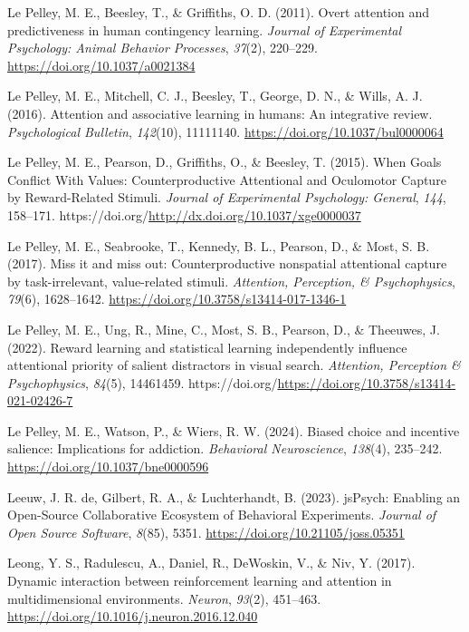 \documentclass[
  man,
  floatsintext,
  longtable,
  nolmodern,
  notxfonts,
  notimes,
  mask,
  colorlinks=true,linkcolor=blue,citecolor=blue,urlcolor=blue]{apa7}
\newlength{\cslhangindent}
\newenvironment{CSLReferences}[2] %
 {\begin{list}{}{%
  \setlength{\itemindent}{0pt}
  \setlength{\leftmargin}{0pt}
  \setlength{\parsep}{0pt}
  \ifodd #1
   \setlength{\leftmargin}{\cslhangindent}
   \setlength{\itemindent}{-1\cslhangindent}
  \fi
  \setlength{\itemsep}{#2\baselineskip}}}
 {\end{list}}
\begin{document}
\begin{CSLReferences}{1}{0}
Le Pelley, M. E., Beesley, T., \& Griffiths, O. D. (2011). Overt
attention and predictiveness in human contingency learning.
\emph{Journal of Experimental Psychology: Animal Behavior Processes},
\emph{37}(2), 220--229. \url{https://doi.org/10.1037/a0021384}

Le Pelley, M. E., Mitchell, C. J., Beesley, T., George, D. N., \& Wills,
A. J. (2016). Attention and associative learning in humans: An
integrative review. \emph{Psychological Bulletin}, \emph{142}(10),
11111140. \url{https://doi.org/10.1037/bul0000064}

Le Pelley, M. E., Pearson, D., Griffiths, O., \& Beesley, T. (2015).
When Goals Conflict With Values: Counterproductive Attentional and
Oculomotor Capture by Reward-Related Stimuli. \emph{Journal of
Experimental Psychology: General}, \emph{144}, 158--171.
https://doi.org/\url{http://dx.doi.org/10.1037/xge0000037}

Le Pelley, M. E., Seabrooke, T., Kennedy, B. L., Pearson, D., \& Most,
S. B. (2017). Miss it and miss out: Counterproductive nonspatial
attentional capture by task-irrelevant, value-related stimuli.
\emph{Attention, Perception, \& Psychophysics}, \emph{79}(6),
1628--1642. \url{https://doi.org/10.3758/s13414-017-1346-1}

Le Pelley, M. E., Ung, R., Mine, C., Most, S. B., Pearson, D., \&
Theeuwes, J. (2022). Reward learning and statistical learning
independently influence attentional priority of salient distractors in
visual search. \emph{Attention, Perception \& Psychophysics},
\emph{84}(5), 14461459.
https://doi.org/\url{https://doi.org/10.3758/s13414-021-02426-7}

Le Pelley, M. E., Watson, P., \& Wiers, R. W. (2024). Biased choice and
incentive salience: Implications for addiction. \emph{Behavioral
Neuroscience}, \emph{138}(4), 235--242.
\url{https://doi.org/10.1037/bne0000596}

Leeuw, J. R. de, Gilbert, R. A., \& Luchterhandt, B. (2023). jsPsych:
Enabling an Open-Source Collaborative Ecosystem of Behavioral
Experiments. \emph{Journal of Open Source Software}, \emph{8}(85), 5351.
\url{https://doi.org/10.21105/joss.05351}

Leong, Y. S., Radulescu, A., Daniel, R., DeWoskin, V., \& Niv, Y.
(2017). Dynamic interaction between reinforcement learning and attention
in multidimensional environments. \emph{Neuron}, \emph{93}(2), 451--463.
\url{https://doi.org/10.1016/j.neuron.2016.12.040}


\end{CSLReferences}
\end{document}
